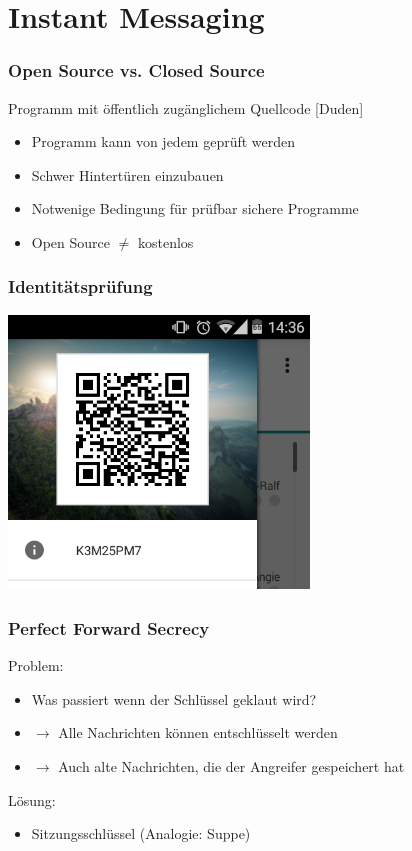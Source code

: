 \section{Instant Messaging}


\begin{frame}
  \frametitle{Open Source vs. Closed Source}
  \begin{definition}
   Programm mit öffentlich zugänglichem Quellcode \hfill \tiny [Duden]
  \end{definition}

  \begin{itemize}
   \item Programm kann von jedem geprüft werden
   \item Schwer Hintertüren einzubauen
   \item Notwenige Bedingung für prüfbar sichere Programme
   \item Open Source $\neq$ kostenlos
  \end{itemize}
\end{frame}

\begin{frame}
  \frametitle{Identitätsprüfung}
  \center
  \includegraphics[width=0.6\textwidth]{figures/Threema_ID.png}
\end{frame}

\begin{frame}
  \frametitle{Perfect Forward Secrecy}
  Problem:
  \begin{itemize}
    \item Was passiert wenn der Schlüssel geklaut wird?
    \pause
    \item $\rightarrow$ Alle Nachrichten können entschlüsselt werden
    \item $\rightarrow$ Auch alte Nachrichten, die der Angreifer gespeichert hat
  \end{itemize}
  \pause
  Lösung:
  \begin{itemize}
    \item Sitzungsschlüssel (Analogie: Suppe)
  \end{itemize}
  \center {}\let\thefootnote\relax{}
\end{frame}

